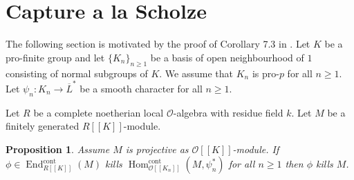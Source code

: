 \documentclass[JEP,XML,SOM,Unicode,NoEqCountersInSection]{cedram}
\let\mathcal\mathscr
\newtheorem{prop}{Proposition}[section]
\theoremstyle{definition}
\DeclareMathOperator{\End}{End}
\DeclareMathOperator{\Hom}{Hom}
\newcommand{\br}[1]{[\![#1]\!]}
\newcommand{\cO}{\mathcal{O}}
\newcommand{\cont}{\mathrm{cont}}
\begin{document}
\section{Capture a la Scholze}\label{sec_scholze}

The following section is motivated by the proof of Corollary 7.3 in \cite{scholze}. Let $K$ be a pro-finite group and let $\{K_n\}_{n\ge 1}$ be a basis of open neighbourhood of
$1$ consisting of normal subgroups of $K$. We assume that $K_n$ is pro-$p$ for all $n\ge 1$. Let
$\psi_n: K_n \to \overline{L}^*$ be a smooth character for all $n\ge 1$.

Let $R$ be a complete noetherian local $\cO$-algebra with residue field $k$. Let $M$ be a
finitely generated $R\br{K}$-module.

\begin{prop}\label{easy_does_it} Assume $M$ is projective as $\cO\br{K}$-module. If $\phi\in\End^{\cont}_{R\br{K}}(M)$ kills $\Hom_{\cO\br{K_n}}^{\cont}(M, \psi_n^*)$ for all $n\ge 1$ then
$\phi$ kills $M$.
\end{prop}
\end{document}
